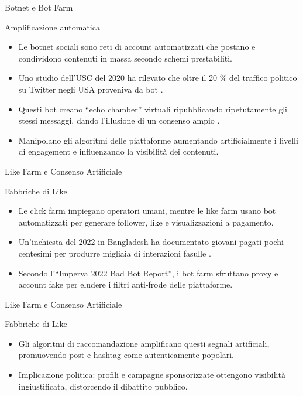 \documentclass[12pt]{beamer}
\begin{document}
\begin{frame}{Botnet e Bot Farm}
  \small
  \begin{alertblock}{Amplificazione automatica}
    \begin{itemize}
      \item Le botnet sociali sono reti di account automatizzati che postano e condividono contenuti in massa secondo schemi prestabiliti.
      \item Uno studio dell’USC del 2020 ha rilevato che oltre il 20 \% del traffico politico su Twitter negli USA proveniva da bot \cite{NgCarley2025,uscsocial2020}.
      \item Questi bot creano “echo chamber” virtuali ripubblicando ripetutamente gli stessi messaggi, dando l’illusione di un consenso ampio \cite{echolab2020}.
      \item Manipolano gli algoritmi delle piattaforme aumentando artificialmente i livelli di engagement e influenzando la visibilità dei contenuti.
    \end{itemize}
  \end{alertblock}
\end{frame}


\begin{frame}{Like Farm e Consenso Artificiale}

  \begin{alertblock}{Fabbriche di Like}
    \begin{itemize}
      \item Le click farm impiegano operatori umani, mentre le like farm usano bot automatizzati per generare follower, like e visualizzazioni a pagamento.
      \item Un’inchiesta del 2022 in Bangladesh ha documentato giovani pagati pochi centesimi per produrre migliaia di interazioni fasulle .\cite{channel4_bangladesh,arthur2013clickfarms}
      \item Secondo l’“Imperva 2022 Bad Bot Report”, i bot farm sfruttano proxy e account fake per eludere i filtri anti-frode delle piattaforme.\cite{imperva_badbot2022}
    \end{itemize}
  \end{alertblock}
\end{frame}

\begin{frame}{Like Farm e Consenso Artificiale}
  \begin{alertblock}{Fabbriche di Like}
    \begin{itemize}
      \item Gli algoritmi di raccomandazione amplificano questi segnali artificiali, promuovendo post e hashtag come autenticamente popolari.
      \item Implicazione politica: profili e campagne sponsorizzate ottengono visibilità ingiustificata, distorcendo il dibattito pubblico.
    \end{itemize}
  \end{alertblock}
\end{frame}
\end{document}
